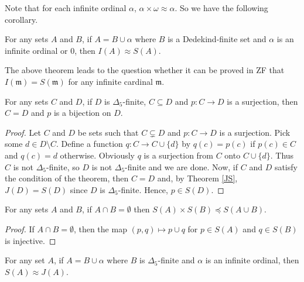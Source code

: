 Note that for each infinite ordinal $\alpha$, $\alpha\times\omega\approx\alpha$. So we have the following corollary.\\

\begin{corollary}\label{longest}
For any sets $A$ and $B$, if $A=B \cup \alpha$ where $B$ is a Dedekind-finite set and $\alpha$ is an infinite ordinal or $0$, then $I(A) \approx S(A)$.
\end{corollary}



The above theorem leads to the question whether it can be proved in ZF that $I(\mathfrak{m})=S(\mathfrak{m})$ for any infinite cardinal $\mathfrak{m}$.


\begin{lemma}\label{lem1}
    For any sets $C$ and $D$, if $D$ is $\Delta_5$-finite, $C\subseteq D$ and $p:C\to D$ is a surjection, then $C=D$ and $p$ is a bijection on $D$.
\end{lemma}

\begin{proof}
    Let $C$ and $D$ be sets such that $C\subsetneq D$ and $p:C\to D$ is a surjection. Pick some $d\in D\setminus C$. Define a function $q:C\to C\cup\{d\}$ by $q(c)=p(c)$ if $p(c)\in C$ and $q(c)=d$ otherwise. Obviously $q$ is a surjection from $C$ onto $C\cup\{d\}$. Thus $C$ is not $\Delta_5$-finite, so $D$ is not $\Delta_5$-finite and we are done. Now, if $C$ and $D$ satisfy the condition of the theorem, then $C=D$ and, by Theorem \ref{JS}, $J(D)=S(D)$ since $D$ is $\Delta_5$-finite. Hence, $p\in S(D)$.
\end{proof}

\begin{theorem}\label{Sdisjoint}
For any sets $A$ and $B$, if $A\cap B=\emptyset$ then $S(A)\times S(B)\preceq S(A\cup B)$.
\end{theorem}

\begin{proof}
If $A\cap B = \emptyset$, then the map $(p,q) \mapsto p\cup q$ for $p\in S(A)$ and $q\in S(B)$ is injective.
\end{proof}

\begin{theorem}
   For any set $A$, if $A = B\cup\alpha$ where $B$ is $\Delta_5$-finite and $\alpha$ is an infinite ordinal, then $S(A)\approx J(A)$.
\end{theorem}


